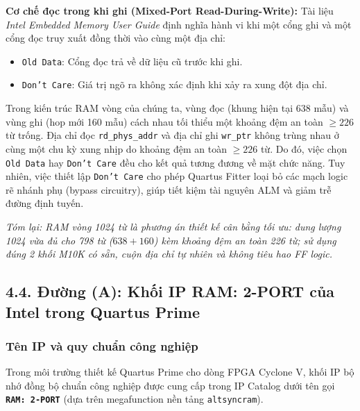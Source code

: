 \textbf{Cơ chế đọc trong khi ghi (Mixed-Port Read-During-Write):}
Tài liệu \emph{Intel Embedded Memory User Guide} định nghĩa hành vi khi một cổng ghi và một cổng đọc truy xuất đồng thời vào cùng một địa chỉ:
\begin{itemize}[leftmargin=1.5em, itemsep=2pt]
    \item \texttt{Old Data}: Cổng đọc trả về dữ liệu cũ trước khi ghi.
    \item \texttt{Don't Care}: Giá trị ngõ ra không xác định khi xảy ra xung đột địa chỉ.
\end{itemize}
Trong kiến trúc RAM vòng của chúng ta, vùng đọc (khung hiện tại 638 mẫu) và vùng ghi (hop mới 160 mẫu) cách nhau tối thiểu một khoảng đệm an toàn $\ge 226$ từ trống. Địa chỉ đọc \texttt{rd\_phys\_addr} và địa chỉ ghi \texttt{wr\_ptr} không trùng nhau ở cùng một chu kỳ xung nhịp do khoảng đệm an toàn $\ge 226$ từ. Do đó, việc chọn \texttt{Old Data} hay \texttt{Don't Care} đều cho kết quả tương đương về mặt chức năng. Tuy nhiên, việc thiết lập \texttt{Don't Care} cho phép Quartus Fitter loại bỏ các mạch logic rẽ nhánh phụ (bypass circuitry), giúp tiết kiệm tài nguyên ALM và giảm trễ đường định tuyến.

\textit{Tóm lại: RAM vòng 1024 từ là phương án thiết kế cân bằng tối ưu: dung lượng 1024 vừa đủ cho 798 từ ($638 + 160$) kèm khoảng đệm an toàn 226 từ; sử dụng đúng 2 khối M10K có sẵn, cuộn địa chỉ tự nhiên và không tiêu hao FF logic.}

\subsection*{4.4. Đường (A): Khối IP RAM: 2-PORT của Intel trong Quartus Prime}

\subsubsection*{Tên IP và quy chuẩn công nghiệp}
Trong môi trường thiết kế Quartus Prime cho dòng FPGA Cyclone V, khối IP bộ nhớ đồng bộ chuẩn công nghiệp được cung cấp trong IP Catalog dưới tên gọi \textbf{\texttt{RAM: 2-PORT}} (dựa trên megafunction nền tảng \texttt{altsyncram}).

